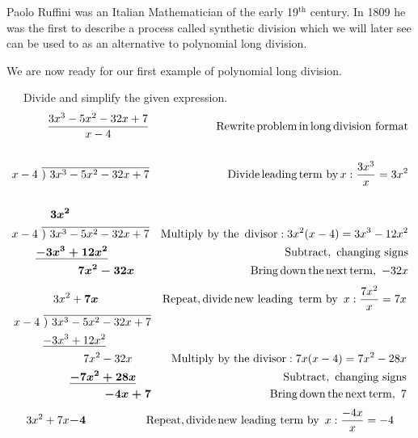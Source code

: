 {} Paolo Ruffini was an Italian Mathematician of
the early 19$^{\text{th}}$ century. In 1809 he was the first to describe a process called
synthetic division which we will later see can be used to as an alternative to polynomial long division.\pp

We are now ready for our first example of polynomial long division.
\begin{example}~~~Divide and simplify the given expression.
  \begin{eqnarray*}
    \frac{3 x^3 - 5 x^2 - 32 x + 7}{x - 4} &  & \operatorname{Rewrite} \operatorname{problem}
    \operatorname{in} \operatorname{long} \operatorname{division~format}\\
    &  & \\
    x - 4~\overline{)~3 x^3 - 5 x^2 - 32 x + 7} &  & \operatorname{Divide} \operatorname{leading}
    \operatorname{term~by} x: \frac{3 x^3}{x} = 3 x^2\\
    &  & \\
    \boldsymbol{3 x^2}~~~~~~~~~~~~~~~~~~~~~  &  & \\
    x - 4~ \overline{)~3 x^3 - 5 x^2 - 32 x + 7} &  & \operatorname{Multiply~by~the~} \operatorname{divisor} : 3 x^2 (x - 4) = 3 x^3 -
    12 x^2\\
    \underline{\boldsymbol{- 3 x^3 + 12 x^2 } }~~~~~~~~~~~ &  & \operatorname{Subtract,~changing~signs}\\
    \boldsymbol{7 x^2 - 32 x}~~~~  &  & \operatorname{Bring} \operatorname{down} \operatorname{the}
    \operatorname{next} \operatorname{term,~}-32x
\end{eqnarray*}
\newpage
 \begin{eqnarray*}
		3 x^2 + \boldsymbol{7 x}~~~~~~~~~~~~~~  &  & \operatorname{Repeat}, \operatorname{divide} \operatorname{new~leading~}
    \operatorname{term~by~} x: \frac{7 x^2}{x} = 7 x\\
    x - 4~ \overline{)~3 x^3 - 5 x^2 - 32 x + 7} &  & \\
    \underline{- 3 x^3 + 12 x^2 }~~~~~~~~~~~~ &  & \\
    7 x^2 - 32 x~~~~~ &  & \operatorname{Multiply~by~the~divisor} : 7 x (x - 4) = 7 x^2 - 28 x\\
    \underline{\boldsymbol{- 7 x^2 + 28 x}}~~~~  &  & \operatorname{Subtract,~changing~signs}\\
    \boldsymbol{- 4 x + 7} &  & \operatorname{Bring} \operatorname{down} \operatorname{the} \operatorname{next}
    \operatorname{term},~7
\end{eqnarray*}
 \begin{eqnarray*}
    3 x^2 + 7 x \tmmathbf{- 4}~~~~~~~~~~~~~  &  & \tmop{Repeat}, \tmop{divide} \tmop{new~leading~term~by~} x: \frac{- 4 x}{x} = - 4\\

\end{eqnarray*}
\end{example}
